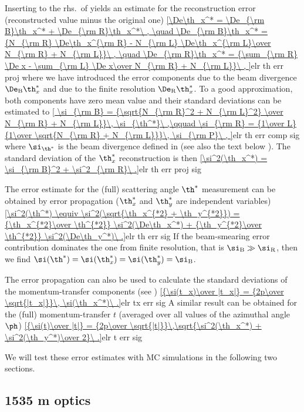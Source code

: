 Inserting  to the rhs.~of  yields an estimate for the reconstruction error (reconstructed value minus the original one)
\eqref{\De\th_x^* = \De_{\rm B}\th_x^* + \De_{\rm R}\th_x^*\ ,
	\quad \De_{\rm B}\th_x^* = {N_{\rm R} \De\th_x^{\rm R} - N_{\rm L} \De\th_x^{\rm L}\over N_{\rm R} + N_{\rm L}}\ ,
	\quad \De_{\rm R}\th_x^* = {\sum_{\rm R} \De x - \sum_{\rm L} \De x\over  N_{\rm R} + N_{\rm L}}\ ,
}{elr th err proj}
where we have introduced the error components due to the beam divergence $\De_{\rm B}\th_x^*$ and due to the finite resolution $\De_{\rm R}\th_x^*$. To a good approximation, both components have zero mean value and their standard deviations can be estimated to
\eqref{
	\si_{\rm B} = {\sqrt{N_{\rm R}^2 + N_{\rm L}^2} \over N_{\rm R} + N_{\rm L}}\, \si_{\th^*}\ ,\qquad
	\si_{\rm R} = {1\over L} {1\over \sqrt{N_{\rm R} + N_{\rm L}}}\, \si_{\rm P}\ ,
}{elr th err comp sig}
where $\si_{\th^*}$ is the beam divergence defined in  (see also the text below ). The standard deviation of the $\th_x^*$ reconstruction is then
\eqref{\si^2(\th_x^*) = \si_{\rm B}^2 + \si^2_{\rm R}\ .}{elr th err proj sig}

The error estimate for the (full) scattering angle $\th^*$ measurement can be obtained by error propagation ($\th_x^*$ and $\th_y^*$ are independent variables)
\eqref{\si^2(\th^*) \equiv \si^2(\sqrt{\th_x^{*2} + \th_y^{*2}}) = {\th_x^{*2}\over \th^{*2}} \si^2(\De\th_x^*) + {\th_y^{*2}\over \th^{*2}} \si^2(\De\th_y^*)\ .}{elr th err sig}
If the beam-smearing error contribution dominates the one from finite resolution, that is $\si_{\rm B} \gg \si_{\rm R}$, then we find $\si(\th^*) = \si(\th_x^*) = \si(\th_y^*) = \si_{\rm B}$.

The error propagation can also be used to calculate the standard deviations of the momentum-transfer components (see )
\eqref{{\si(t_x)\over |t_x|} = {2p\over \sqrt{|t_x|}}\, \si(\th_x^*)\ .}{elr tx err sig}
A similar result can be obtained for the (full) momentum-transfer $t$ (averaged over all values of the azimuthal angle $\ph$)
\eqref{{\si(t)\over |t|} = {2p\over \sqrt{|t|}}\,\sqrt{\si^2(\th_x^*) + \si^2(\th_y^*)\over 2}\ .}{elr t err sig}

We will test these error estimates with MC simulations in the following two sections.


\subsection[elr 1535]{1535 m optics}

